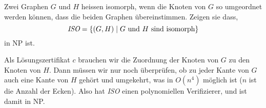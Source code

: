 Zwei Graphen $G$ und $H$ heissen isomorph, wenn die Knoten von $G$ so
umgeordnet werden können, dass die beiden Graphen übereinstimmen.
Zeigen sie dass,
\[
\text{\it ISO} = \{(G,H)\; |\;\text{$G$ und $H$ sind isomorph}\}
\]
in NP ist.


\begin{loesung}
Als Lösungszertifikat $c$ brauchen wir die Zuordnung der Knoten
von $G$ zu den Knoten von $H$. Dann müssen wir nur noch überprüfen,
ob zu jeder Kante von $G$ auch eine Kante von $H$ gehört und
umgekehrt, was in $O(n^4)$ möglich ist ($n$ ist die Anzahl der Ecken).
Also hat {\it ISO} einen polynomiellen Verifizierer, und ist damit
in NP.
\end{loesung}
